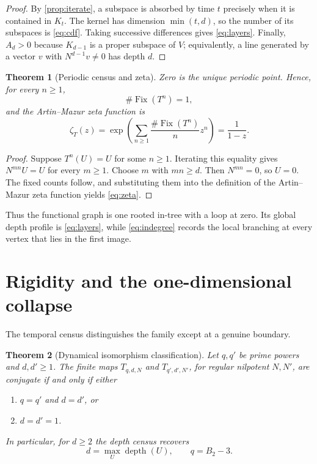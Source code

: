 \documentclass[11pt,a4paper]{amsart}
\newcommand{\Fix}{\operatorname{Fix}}
\newcommand{\depth}{\operatorname{depth}}
\newtheorem{theorem}{Theorem}[section]
\begin{document}
\begin{proof}
By \cref{prop:iterate}, a subspace is absorbed by time $t$ precisely when it
is contained in $K_t$.  The kernel has dimension $\min(t,d)$, so the number
of its subspaces is \eqref{eq:cdf}.  Taking successive differences gives
\eqref{eq:layers}.  Finally, $A_d>0$ because $K_{d-1}$ is a proper subspace
of $V$; equivalently, a line generated by a vector $v$ with
$N^{d-1}v\neq0$ has depth $d$.
\end{proof}

\begin{theorem}[Periodic census and zeta]
\label{thm:zeta}
Zero is the unique periodic point.  Hence, for every $n\geq1$,
\[
 \#\Fix(T^n)=1,
\]
and the Artin--Mazur zeta function is
\begin{equation}
 \label{eq:zeta}
 \zeta_T(z)
 =\exp\!\left(\sum_{n\geq1}\frac{\#\Fix(T^n)}{n}z^n\right)
 =\frac{1}{1-z}.
\end{equation}
\end{theorem}

\begin{proof}
Suppose $T^n(U)=U$ for some $n\geq1$.  Iterating this equality gives
$N^{mn}U=U$ for every $m\geq1$.  Choose $m$ with $mn\geq d$.  Then
$N^{mn}=0$, so $U=0$.  The fixed counts follow, and substituting them into
the definition of the Artin--Mazur zeta function
\citep{ArtinMazur1965} yields \eqref{eq:zeta}.
\end{proof}

Thus the functional graph is one rooted in-tree with a loop at zero.  Its
global depth profile is \eqref{eq:layers}, while \eqref{eq:indegree} records
the local branching at every vertex that lies in the first image.

\section{Rigidity and the one-dimensional collapse}

The temporal census distinguishes the family except at a genuine boundary.

\begin{theorem}[Dynamical isomorphism classification]
\label{thm:rigidity}
Let $q,q'$ be prime powers and $d,d'\geq1$.  The finite maps
$T_{q,d,N}$ and $T_{q',d',N'}$, for regular nilpotent $N,N'$, are conjugate
if and only if either
\begin{enumerate}
 \item $q=q'$ and $d=d'$, or
 \item $d=d'=1$.
\end{enumerate}
In particular, for $d\geq2$ the depth census recovers
\begin{equation}
 \label{eq:recovery}
 d=\max_U\depth(U),
 \qquad
 q=B_2-3.
\end{equation}
\end{theorem}
\end{document}
